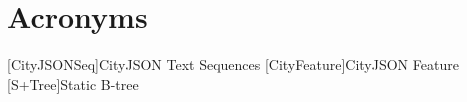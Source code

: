
\chapter*{Acronyms}

\begin{acronym}[UML]
  [CityJSONSeq]{CityJSON Text Sequences}
  [CityFeature]{CityJSON Feature}
  [S+Tree]{Static B-tree}
\end{acronym}